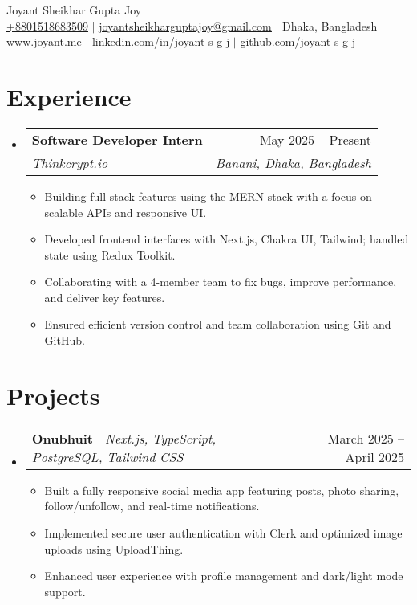 \documentclass[a4paper,11pt]{article}
\makeatletter
\newcommand{\resumeItem}[1]{
  \item\small{
    {#1 \vspace{-2pt}}
  }
}
\newcommand{\resumeSubheading}[4]{
  \vspace{-2pt}\item
    \begin{tabular*}{0.97\textwidth}[t]{l@{\extracolsep{\fill}}r}
      \textbf{#1} & #2 \\
      \textit{\small#3} & \textit{\small #4} \\
    \end{tabular*}\vspace{-7pt}
}
\newcommand{\resumeProjectHeading}[2]{
    \item
    \begin{tabular*}{0.97\textwidth}{l@{\extracolsep{\fill}}r}
      \small#1 & #2 \\
    \end{tabular*}\vspace{-7pt}
}
\newcommand{\resumeSubHeadingListStart}{\begin{itemize}[leftmargin=0.15in, label={}]}
\newcommand{\resumeSubHeadingListEnd}{\end{itemize}}
\newcommand{\resumeItemListStart}{\begin{itemize}}
\newcommand{\resumeItemListEnd}{\end{itemize}\vspace{-5pt}}
\makeatother
\begin{document}
\begin{center}
    {\Huge \rmfamily Joyant Sheikhar Gupta Joy} \\ \vspace{1pt}
    \small \href{tel:+8801518683509}{\underline{+8801518683509}} $|$ 
    \href{mailto:joyantsheikharguptajoy@gmail.com}{\underline{joyantsheikharguptajoy@gmail.com}} $|$ 
    \small{Dhaka, Bangladesh} \\
    \href{https://joyant.me/}{\underline{www.joyant.me}} $|$
    \href{https://www.linkedin.com/in/joyant-s-g-j/}{\underline{linkedin.com/in/joyant-s-g-j}} $|$
    \href{https://github.com/joyant-s-g-j}{\underline{github.com/joyant-s-g-j}}
\end{center}

\section{Experience}
  \resumeSubHeadingListStart
    \resumeSubheading
      {Software Developer Intern}{May 2025 -- Present}
      {Thinkcrypt.io}{Banani, Dhaka, Bangladesh }
      \resumeItemListStart
        \resumeItem{Building full-stack features using the MERN stack with a focus on scalable APIs and responsive UI.}
        \resumeItem{Developed frontend interfaces with Next.js, Chakra UI, Tailwind; handled state using Redux Toolkit.}
        \resumeItem{Collaborating with a 4-member team to fix bugs, improve performance, and deliver key features.}
        \resumeItem{Ensured efficient version control and team collaboration using Git and GitHub.}
      \resumeItemListEnd
  \resumeSubHeadingListEnd

\section{Projects}
  \resumeSubHeadingListStart
    \resumeProjectHeading
        {\textbf{Onubhuit} $|$ \emph{Next.js, TypeScript, PostgreSQL, Tailwind CSS}}{March 2025 -- April 2025}
        \resumeItemListStart
          \resumeItem{Built a fully responsive social media app featuring posts, photo sharing, follow/unfollow, and real-time notifications.}
          \resumeItem{Implemented secure user authentication with Clerk and optimized image uploads using UploadThing.}
          \resumeItem{Enhanced user experience with profile management and dark/light mode support.}
        \resumeItemListEnd
  \resumeSubHeadingListEnd
\end{document}
